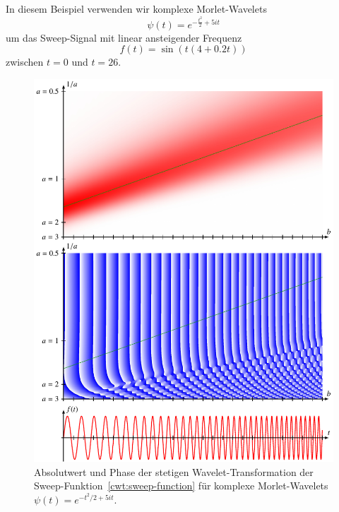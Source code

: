 \begin{beispiel}
In diesem Beispiel verwenden wir komplexe Morlet-Wavelets
\begin{equation}
\psi(t) = e^{-\frac{t^2}2 +5it}
\end{equation}
um das Sweep-Signal mit linear ansteigender Frequenz
\begin{equation}
f(t)
=
\sin(t(4+0.2t))
\label{cwt:sweep-function}
\end{equation}
zwischen $t=0$ und $t=26$.
\begin{figure}
\centering
\includegraphics[width=\hsize]{chapters/4-cwt/images/sweep2.pdf}
\caption{Absolutwert und Phase der stetigen Wavelet-Transformation
der Sweep-Funktion~\eqref{cwt:sweep-function} 
für komplexe Morlet-Wavelets $\psi(t) = e^{-t^2/2+5it}$.
\label{cwt:sweep-cwt-abs-phase}}
\end{figure}
\begin{figure}
\centering

\end{figure}
\end{beispiel}
